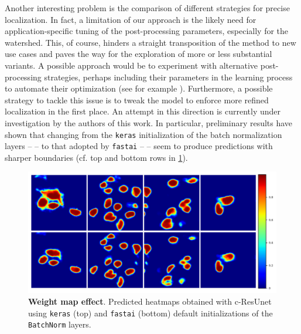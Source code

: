 Another interesting problem is the comparison of different strategies for precise localization. In fact, a limitation of our approach is the likely need for application-specific tuning of the post-processing parameters, especially for the watershed.
This, of course, hinders a straight transposition of the method to new use cases and paves the way for the exploration of more or less substantial variants.
A possible approach would be to experiment with alternative post-processing strategies, perhaps including their parameters in the learning process to automate their optimization (see for example ).
Furthermore, a possible strategy to tackle this issue is to tweak the model to enforce more refined localization in the first place.
An attempt in this direction is currently under investigation by the authors of this work.
In particular, preliminary results have shown that changing from the \texttt{keras} initialization of the batch normalization layers --  -- to that adopted by \texttt{fastai} \cite{2020fastai} --  -- seem to produce predictions with sharper boundaries (cf. top and bottom rows in \cref{fig:kerasVSfastai_bathnorm}).
\begin{figure}
\centering
\includegraphics[width=\textwidth]{figures/610_future_works/Tc-ResUnetVSBbatchnorm_effect.pdf}
\caption{\textbf{Weight map effect}. 
Predicted heatmaps obtained with c-ResUnet using \texttt{keras} (top) and \texttt{fastai} (bottom) default initializations of the \texttt{BatchNorm} layers.} 
\label{fig:kerasVSfastai_bathnorm}
\end{figure}

